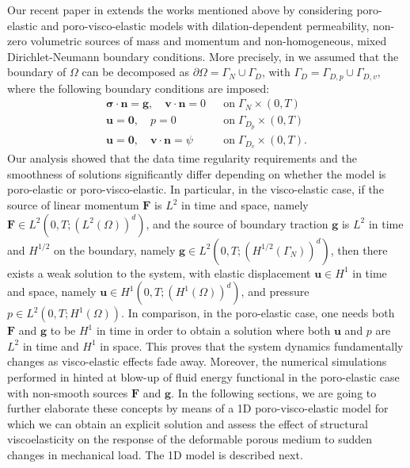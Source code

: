 \documentclass[12pt,a4paper]{amsart}
\theoremstyle{definition}
\begin{document}
Our recent paper in \cite{ARMA} extends  the works mentioned above by considering
poro-elastic and poro-visco-elastic models with dilation-dependent permeability, non-zero volumetric sources of mass and momentum and non-homogeneous, mixed Dirichlet-Neumann boundary conditions. More precisely, in \cite{ARMA} we assumed that  the boundary of $\Omega$ can be decomposed as $\partial \Omega = \Gamma_N \cup \Gamma_D$, with $\Gamma_D = \Gamma_{D,p}\cup \Gamma_{D,v}$, where the following boundary conditions are imposed:
\begin{align}
\bm\sigma \cdot \mathbf n = \mathbf g, \quad \mathbf v \cdot \mathbf n = 0 && \mbox{on}\; \Gamma_N\times (0,T)\\
\mathbf u  = \mathbf 0, \quad p = 0 && \mbox{on}\; \Gamma_{D_p}\times (0,T)\\
\mathbf u  = \mathbf 0, \quad \mathbf v \cdot \mathbf n = \psi && \mbox{on}\; \Gamma_{D_v}\times (0,T).
\end{align}
%
Our analysis showed that the data time regularity requirements and the smoothness of solutions significantly differ depending on whether the model is poro-elastic or poro-visco-elastic. In particular, in the visco-elastic case, if the source of linear momentum $\mathbf F$ is $L^2$ in time and space, namely $\mathbf F\in L^2(0,T;(L^2(\Omega))^d)$, and the source of boundary traction $\mathbf g$ is $L^2$ in time and $H^{1/2}$ on the boundary, namely $\mathbf g \in L^2(0,T;(H^{1/2}(\Gamma_N))^d)$,
 then there exists a weak solution to the system, with elastic displacement  $\mathbf u \in H^1$ in time and space, namely $\mathbf u \in H^1(0,T;(H^1(\Omega))^d)$, and pressure  $p \in L^2(0,T;H^1(\Omega)) $.
%
 In comparison, in the poro-elastic case, one needs both $\mathbf F$ and $\mathbf g$ to be $H^1$ in time in order to obtain a solution where both $\mathbf u$ and $p$ are $L^2$ in time and $H^1$ in space. This proves that the system dynamics fundamentally changes as visco-elastic effects fade away. Moreover, the numerical simulations performed in \cite{ARMA} hinted at blow-up of fluid energy functional in the poro-elastic case with non-smooth sources $\mathbf F$ and $\mathbf g$. In the following sections, we are going to further elaborate these concepts by means of a 1D poro-visco-elastic model for which we can obtain an explicit solution and assess the effect of structural viscoelasticity on the response of the deformable porous medium to sudden changes in mechanical load. The 1D model is described next.
\end{document}
